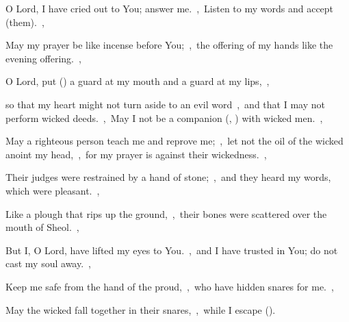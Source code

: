 \documentclass[12pt,twoside,a5paper]{article}
\begin{document}
\begin{normalparskip}
  O Lord, I have cried out to You; answer me.~\sep\ Listen to my words and accept (them).~\sep


  May my prayer be like incense before You;~\sep\ the offering of my hands like the evening offering.~\sep

  O Lord, put () a guard at my mouth and a guard at my lips,~\sep

  so that my heart might not turn aside to an evil word~\sep\ and that I may not perform wicked deeds.~\sep\ May I not be a companion (, ) with wicked men.~\sep

  May a righteous person teach me and reprove me;~\sep\ let not the oil of the wicked anoint my head,~\sep\ for my prayer is against their wickedness.~\sep

  Their judges were restrained by a hand of stone;~\sep\ and they heard my words, which were pleasant.~\sep

  Like a plough that rips up the ground,~\sep\ their bones were scattered over the mouth of Sheol.~\sep

  But I, O Lord, have lifted my eyes to You.~\sep\ and I have trusted in You; do not cast my soul away.~\sep

  Keep me safe from the hand of the proud,~\sep\ who have hidden snares for me.~\sep

  May the wicked fall together in their snares,~\sep\ while I escape ().
\end{normalparskip}





\end{document}
